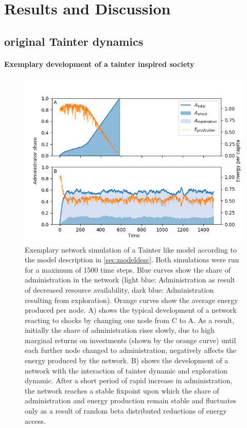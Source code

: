 \section{Results and Discussion}

\subsection{original Tainter dynamics}

\paragraph{Exemplary development of a tainter inspired society}

\begin{figure}[htb]
    \centering
    \includegraphics[width=\linewidth]{../figures/Admin_Ecap_twocases.png}
    \caption{Exemplary network simulation of a Tainter like model according to the model description in \ref{sec:modeldesc}. Both simulations were run for a maximum of 1500 time steps. Blue curves show the share of administration in the network (light blue: Administration as result of decreased resource availability, dark blue: Administration resulting from exploration). Orange curves show the average energy produced per node. A) shows the typical development of a network reacting to shocks by changing one node from C to A. As a result, initially the share of administration rises slowly, due to high marginal returns on investments (shown by the orange curve) until each further node changed to administration, negatively affects the energy produced by the network. B) shows the development of a network with the interaction of tainter dynamic and exploration dynamic. After a short period of rapid increase in administration, the network reaches a stable fixpoint upon which the share of administration and energy production remain stable and fluctuates only as a result of random beta distributed reductions of energy access.}
    \label{fig:baseNetworkDev}
\end{figure}


